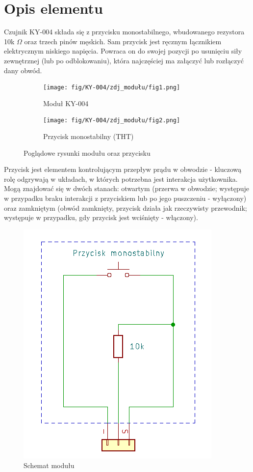 \documentclass[11pt, a4paper]{article}
\author{Dawid Wasung}
\institute{Instytut Robotyki i Inteligencji Maszynowej}
\begin{document}
\newpage

\section*{Opis elementu} 
Czujnik KY-004 składa się z przycisku monostabilnego, wbudowanego rezystora 10k $\Omega$ oraz trzech pinów męskich. Sam przycisk jest ręcznym łącznikiem elektrycznym niskiego napięcia. Powraca on do swojej pozycji po usunięciu siły zewnętrznej (lub po odblokowaniu), która najczęściej ma załączyć lub rozłączyć dany obwód. 
\vspace{0.5cm}
\begin{figure}[h]
\centering
\begin{subfigure}{.5\textwidth}
  \centering
  \texttt{[image: fig/KY-004/zdj\_modułu/fig1.png]}
  \caption{Moduł KY-004 \cite{ArduinoModules:Switch}}
  \label{fig:sub1}
\end{subfigure}%
\begin{subfigure}{.5\textwidth}
  \centering
  \texttt{[image: fig/KY-004/zdj\_modułu/fig2.png]}
  \caption{Przycisk monostabilny (THT) \cite{ArduinoModules:grab}}
  \label{fig:sub2}
\end{subfigure}
\caption{Poglądowe rysunki modułu oraz przycisku}
\label{fig:test}
\end{figure}
\vspace{0.5cm}

Przycisk jest elementem kontrolującym przepływ prądu w obwodzie - kluczową rolę odgrywają w układach, w których potrzebna jest interakcja użytkownika. Mogą znajdować się w dwóch stanach: otwartym (przerwa w obwodzie; występuje w przypadku braku interakcji z przyciskiem lub po jego puszczeniu - wyłączony) oraz zamkniętym (obwód zamknięty, przycisk działa jak rzeczywisty przewodnik; występuje w przypadku, gdy przycisk jest wciśnięty - włączony). 

\vspace{0.5cm}
\begin{figure}[h]
\centering
\includegraphics[width=.4\linewidth]{fig/KY-004/zasada_dzialania/schemacik.png}
\caption{Schemat modułu}
\label{fig:sub2}
\end{figure}
\vspace{0.5cm}
\end{document}
